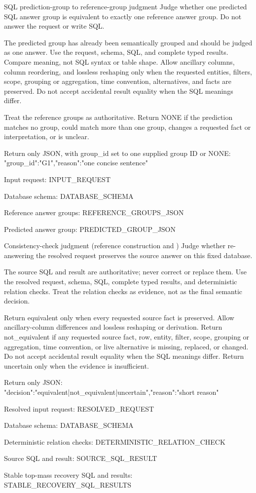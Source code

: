 \begin{promptbox}{SQL prediction-group to reference-group judgment}
Judge whether one predicted SQL answer group is equivalent to exactly one reference answer group. Do not answer the request or write SQL.

The predicted group has already been semantically grouped and should be judged as one answer. Use the request, schema, SQL, and complete typed results. Compare meaning, not SQL syntax or table shape. Allow ancillary columns, column reordering, and lossless reshaping only when the requested entities, filters, scope, grouping or aggregation, time convention, alternatives, and facts are preserved. Do not accept accidental result equality when the SQL meanings differ.

Treat the reference groups as authoritative. Return NONE if the prediction matches no group, could match more than one group, changes a requested fact or interpretation, or is unclear.

Return only JSON, with group_id set to one supplied group ID or NONE:
{"group_id":"G1","reason":"one concise sentence"}

Input request:
{{INPUT_REQUEST}}

Database schema:
{{DATABASE_SCHEMA}}

Reference answer groups:
{{REFERENCE_GROUPS_JSON}}

Predicted answer group:
{{PREDICTED_GROUP_JSON}}
\end{promptbox}

\begin{promptbox}{Consistency-check judgment (reference construction and \circleclar{})}
Judge whether re-answering the resolved request preserves the source answer on this fixed database.

The source SQL and result are authoritative; never correct or replace them. Use the resolved request, schema, SQL, complete typed results, and deterministic relation checks. Treat the relation checks as evidence, not as the final semantic decision.

Return equivalent only when every requested source fact is preserved. Allow ancillary-column differences and lossless reshaping or derivation. Return not_equivalent if any requested source fact, row, entity, filter, scope, grouping or aggregation, time convention, or live alternative is missing, replaced, or changed. Do not accept accidental result equality when the SQL meanings differ. Return uncertain only when the evidence is insufficient.

Return only JSON:
{"decision":"equivalent|not_equivalent|uncertain","reason":"short reason"}

Resolved input request:
{{RESOLVED_REQUEST}}

Database schema:
{{DATABASE_SCHEMA}}

Deterministic relation checks:
{{DETERMINISTIC_RELATION_CHECK}}

Source SQL and result:
{{SOURCE_SQL_RESULT}}

Stable top-mass recovery SQL and results:
{{STABLE_RECOVERY_SQL_RESULTS}}
\end{promptbox}

